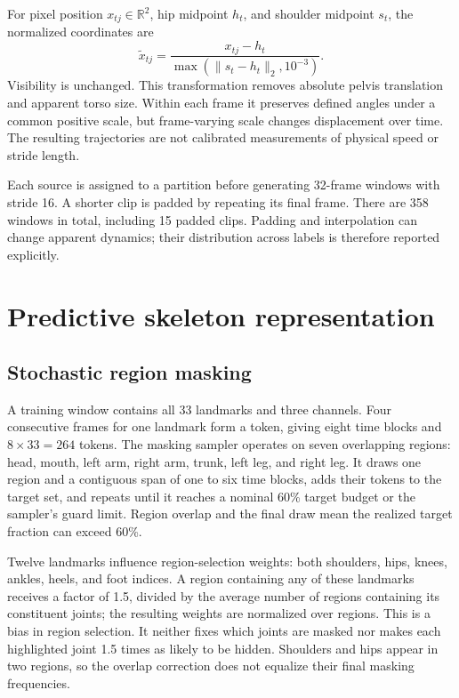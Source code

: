 \documentclass[10pt,twocolumn,letterpaper]{article}
\begin{document}
For pixel position $x_{tj}\in\mathbb{R}^2$, hip midpoint $h_t$, and shoulder midpoint $s_t$, the normalized coordinates are
\begin{equation}
\widetilde{x}_{tj}=\frac{x_{tj}-h_t}{\max(\|s_t-h_t\|_2,10^{-3})}.
\label{eq:normalization}
\end{equation}
Visibility is unchanged. This transformation removes absolute pelvis translation and apparent torso size. Within each frame it preserves defined angles under a common positive scale, but frame-varying scale changes displacement over time. The resulting trajectories are not calibrated measurements of physical speed or stride length.

Each source is assigned to a partition before generating 32-frame windows with stride 16. A shorter clip is padded by repeating its final frame. There are 358 windows in total, including 15 padded clips. Padding and interpolation can change apparent dynamics; their distribution across labels is therefore reported explicitly.

\section{Predictive skeleton representation}
\subsection{Stochastic region masking}
A training window contains all 33 landmarks and three channels. Four consecutive frames for one landmark form a token, giving eight time blocks and $8\times33=264$ tokens. The masking sampler operates on seven overlapping regions: head, mouth, left arm, right arm, trunk, left leg, and right leg. It draws one region and a contiguous span of one to six time blocks, adds their tokens to the target set, and repeats until it reaches a nominal 60\% target budget or the sampler's guard limit. Region overlap and the final draw mean the realized target fraction can exceed 60\%.

Twelve landmarks influence region-selection weights: both shoulders, hips, knees, ankles, heels, and foot indices. A region containing any of these landmarks receives a factor of 1.5, divided by the average number of regions containing its constituent joints; the resulting weights are normalized over regions. This is a bias in region selection. It neither fixes which joints are masked nor makes each highlighted joint 1.5 times as likely to be hidden. Shoulders and hips appear in two regions, so the overlap correction does not equalize their final masking frequencies.
\end{document}
